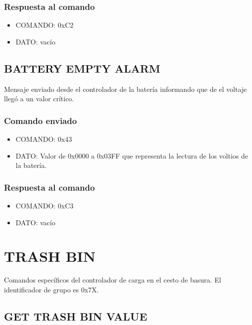 \documentclass[a4paper,10pt]{article}
\begin{document}
\subsubsection*{Respuesta al comando}

\begin{itemize}
	\item{COMANDO:} 0xC2
	\item{DATO:} vac\'io
\end{itemize}

\subsection{BATTERY EMPTY ALARM}
\label{battery_empty}

Mensaje enviado desde el controlador de la bater\'ia informando que de el voltaje lleg\'o a un valor cr\'itico.

\subsubsection*{Comando enviado}

\begin{itemize}
	\item{COMANDO:} 0x43
	\item{DATO:} Valor de 0x0000 a 0x03FF que representa la lectura de los voltios de la bater\'ia.
\end{itemize}

\subsubsection*{Respuesta al comando}

\begin{itemize}
	\item{COMANDO:} 0xC3
	\item{DATO:} vac\'io
\end{itemize}

\section{TRASH BIN}
\label{grupo_trash_bin}

Comandos espec\'ificos del controlador de carga en el cesto de basura.
El identificador de grupo es 0x7X.

\subsection{GET TRASH BIN VALUE}
\label{get_trash_bin_value}
\end{document}
